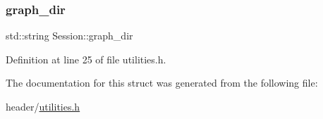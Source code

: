 \subsubsection{\texorpdfstring{graph\+\_\+dir}{graph\_dir}}
{\footnotesize\ttfamily std\+::string Session\+::graph\+\_\+dir}



Definition at line 25 of file utilities.\+h.



The documentation for this struct was generated from the following file\+:\begin{DoxyCompactItemize}
\item 
header/\hyperlink{utilities_8h}{utilities.\+h}\end{DoxyCompactItemize}
